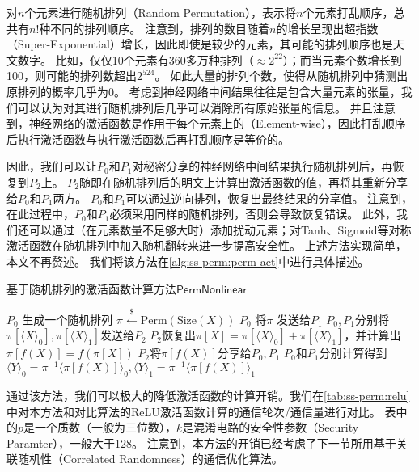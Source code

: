 对$n$个元素进行随机排列（Random Permutation），表示将$n$个元素打乱顺序，总共有$n!$种不同的排列顺序。
%
注意到，排列的数目随着$n$的增长呈现出超指数（Super-Exponential）增长，因此即使是较少的元素，其可能的排列顺序也是天文数字。
%
比如，仅仅10个元素有360多万种排列（$\approx 2^{22}$）；而当元素个数增长到100，则可能的排列数超出$2^{524}$。
%
如此大量的排列个数，使得从随机排列中猜测出原排列的概率几乎为0。
%
考虑到神经网络中间结果往往是包含大量元素的张量，我们可以认为对其进行随机排列后几乎可以消除所有原始张量的信息。
%
并且注意到，神经网络的激活函数是作用于每个元素上的（Element-wise），因此打乱顺序后执行激活函数与执行激活函数后再打乱顺序是等价的。

因此，我们可以让$P_0$和$P_1$对秘密分享的神经网络中间结果执行随机排列后，再恢复到$P_2$上。
%
$P_2$随即在随机排列后的明文上计算出激活函数的值，再将其重新分享给$P_0$和$P_1$两方。
%
$P_0$和$P_1$可以通过逆向排列，恢复出最终结果的分享值。
%
注意到，在此过程中，$P_0$和$P_1$必须采用同样的随机排列，否则会导致恢复错误。
%
此外，我们还可以通过（在元素数量不足够大时）添加扰动元素；对Tanh、Sigmoid等对称激活函数在随机排列中加入随机翻转来进一步提高安全性。
上述方法实现简单，本文不再赘述。
%
我们将该方法在\autoref{alg:ss-perm:perm-act}中进行具体描述。


\begin{algorithm}[h!]
    \caption{基于随机排列的激活函数计算方法$\mathsf{PermNonlinear}$}
    \label{alg:ss-perm:perm-act}
        \begin{algorithmic}[1]
        \State $P_0$ 生成一个随机排列 $\pi \stackrel{\$}{\gets} \text{Perm}(\text{Size}(X))$
        \State $P_0$ 将$\pi$ 发送给$P_1$
        \State $P_0, P_1$分别将$\pi[\langle X \rangle_0], \pi[\langle X \rangle_1]$发送给$P_2$
        \State $P_2$恢复出$\pi[X] = \pi[\langle X \rangle_0] + \pi[\langle X \rangle_1]$，并计算出$\pi[f(X)] = f(\pi[X])$
        \State $P_2$将$\pi[f(X)]$分享给$P_0, P_1$
        \State $P_0$和$P_1$分别计算得到$\langle Y \rangle_0 = \pi^{-1} \langle \pi[f(X)] \rangle_0, \langle Y \rangle_1 = \pi^{-1} \langle \pi[f(X)] \rangle_1$
    \end{algorithmic}
\end{algorithm}


通过该方法，我们可以极大的降低激活函数的计算开销。我们在\autoref{tab:ss-perm:relu}中对本方法和对比算法的ReLU激活函数计算的通信轮次/通信量进行对比。
%
表中的$p$是一个质数（一般为三位数），$k$是混淆电路的安全性参数（Security Paramter），一般大于128。
%
注意到，本方法的开销已经考虑了下一节所用基于关联随机性（Correlated Randomness）的通信优化算法。

